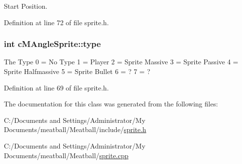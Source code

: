 Start Position. 



Definition at line 72 of file sprite.\-h.

\hypertarget{classc_m_angle_sprite_ac3ca3aa45f5731675f8a61b89f094cc4}{
\subsubsection[{type}]{\setlength{\rightskip}{0pt plus 5cm}int c\-M\-Angle\-Sprite\-::type}}\label{classc_m_angle_sprite_ac3ca3aa45f5731675f8a61b89f094cc4}
The Type 0 = No Type 1 = Player 2 = Sprite Massive 3 = Sprite Passive 4 = Sprite Halfmassive 5 = Sprite Bullet 6 = ? 7 = ? 

Definition at line 69 of file sprite.\-h.



The documentation for this class was generated from the following files\-:\begin{DoxyCompactItemize}
\item 
C\-:/\-Documents and Settings/\-Administrator/\-My Documents/meatball/\-Meatball/include/\hyperlink{sprite_8h}{sprite.\-h}\item 
C\-:/\-Documents and Settings/\-Administrator/\-My Documents/meatball/\-Meatball/\hyperlink{sprite_8cpp}{sprite.\-cpp}\end{DoxyCompactItemize}

